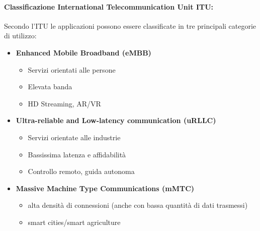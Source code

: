 \paragraph{Classificazione International Telecommunication Unit ITU:} Secondo l'ITU le applicazioni possono essere classificate in tre principali categorie di utilizzo:
\begin{itemize}
	\item \textbf{Enhanced Mobile Broadband (eMBB)}
	\begin{itemize}
		\item Servizi orientati alle persone

		\item Elevata banda

		\item HD Streaming, AR/VR
	\end{itemize}

	\item \textbf{Ultra-reliable and Low-latency communication (uRLLC)}
	\begin{itemize}
		\item Servizi orientate alle industrie

		\item Bassissima latenza e affidabilità

		\item Controllo remoto, guida autonoma
	\end{itemize}

	\item \textbf{Massive Machine Type Communications (mMTC)}
	\begin{itemize}
		\item alta densità di connessioni (anche con bassa quantità di dati trasmessi)

		\item smart cities/smart agriculture
	\end{itemize}
\end{itemize}

